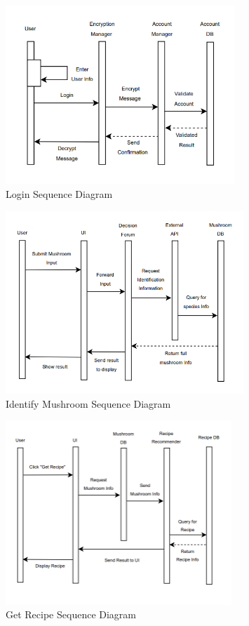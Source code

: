 \documentclass[]{article}
\begin{document}
\begin{figure}[H]
    \centering
    \includegraphics[width=0.77\textwidth]{LoginSequenceDiagram.png}
    \caption{Login Sequence Diagram}
    \label{fig:login}
\end{figure}

\begin{figure}[H]
    \centering
    \includegraphics[width=0.8\textwidth]{IdentifyMushroomSequenceDiagram.png}
    \caption{Identify Mushroom Sequence Diagram}
    \label{fig:identify}
\end{figure}


\begin{figure}[H]
    \centering
    \includegraphics[width=0.76\textwidth]{GetRecipeSequenceDiagram.png}
    \caption{Get Recipe Sequence Diagram}
    \label{fig:recipe}
\end{figure}
\end{document}
